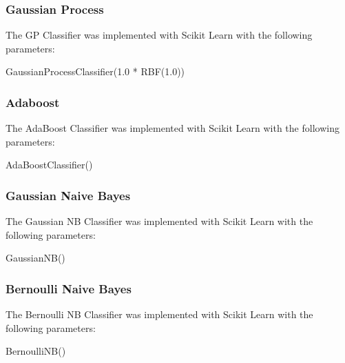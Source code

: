 \subsubsection*{Gaussian Process}

The GP Classifier was implemented with Scikit Learn with the following parameters:

\begin{tcolorbox}
\begin{center}
	GaussianProcessClassifier(1.0 * RBF(1.0))
\end{center}
\end{tcolorbox}

\subsubsection*{Adaboost}

The AdaBoost Classifier was implemented with Scikit Learn with the following parameters:

\begin{tcolorbox}
\begin{center}
	AdaBoostClassifier()
\end{center}
\end{tcolorbox}

\subsubsection*{Gaussian Naive Bayes}

The Gaussian NB Classifier was implemented with Scikit Learn with the following parameters:

\begin{tcolorbox}
\begin{center}
	GaussianNB()
\end{center}
\end{tcolorbox}

\subsubsection*{Bernoulli Naive Bayes}

The Bernoulli NB Classifier was implemented with Scikit Learn with the following parameters:

\begin{tcolorbox}
\begin{center}
	BernoulliNB()
\end{center}
\end{tcolorbox}

